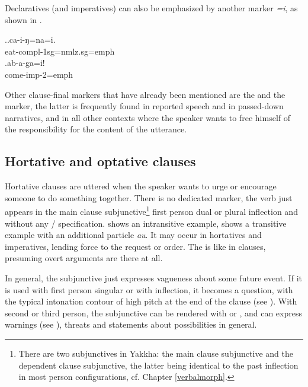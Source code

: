 Declaratives (and imperatives) can also be emphasized by another marker \emph{=i}, as shown in \Next. 

\newpage 

\ex.\ag.ca-i-ŋ=na=i.\\
eat{\sc -compl-1sg=nmlz.sg=emph}\\
 
\bg.ab-a-ga=i!\\
come{\sc -imp-2=emph}\\

Other clause-final markers that have already been mentioned are the  and the  marker, the latter is frequently found in reported speech and in passed-down narratives, and in all other contexts where the speaker wants to free himself of the responsibility for the content of the utterance.

 
\subsection{Hortative and optative clauses}\label{clstr-opt}
 
Hortative clauses are uttered when the speaker wants to urge or encourage someone to do something together. There is no dedicated  marker, the verb just appears in the main clause subjunctive\footnote{There are two subjunctives in Yakkha: the main clause subjunctive and the dependent clause subjunctive, the latter being  identical to the past inflection in most person configurations, cf. Chapter \ref{verbalmorph}.}  first person dual or plural inflection and without any / specification. \Next[a] shows an intransitive example, \Next[b] shows a transitive example with an additional particle \emph{au}. It may occur in hortatives and imperatives, lending force to the request or order.  The  is like in  clauses, presuming  overt arguments are there at all.

In general, the subjunctive just expresses vagueness about some future event. If it is used with first person singular or with  inflection, it becomes a  question, with the typical intonation contour of high pitch at the end of the clause (see \NNext[a]). With second or third person,  the subjunctive can be rendered with  or , and can express warnings (see \NNext[b]), threats \NNext[c] and statements about possibilities in general. 
\largerpage

